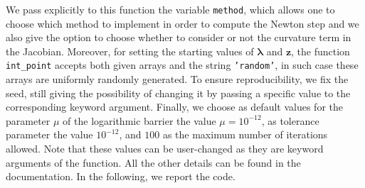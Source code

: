 \documentclass[a4paper,11pt]{article}
\begin{document}
\noindent We pass explicitly to this function the variable \texttt{method}, which allows one to choose which method to implement in order to compute the Newton step and we also give the option to choose whether to consider or not the curvature term in the Jacobian. Moreover, for setting the starting values of $\boldsymbol{\lambda}$ and $\textbf{z}$, the function \texttt{int_point} accepts both given arrays and the string \texttt{'random'}, in such case these arrays are uniformly randomly generated. To ensure reproducibility, we fix the seed, still giving the possibility of changing it by passing a specific value to the corresponding keyword argument.  Finally, we choose as default values for the parameter $\mu$ of the logarithmic barrier the value $\mu = 10^{-12}$, as tolerance parameter the value $10^{-12}$, and $100$ as the maximum number of iterations allowed. Note that these values can be user-changed as they are keyword arguments of the function. All the other details can be found in the documentation. In the following, we report the code.
\end{document}
